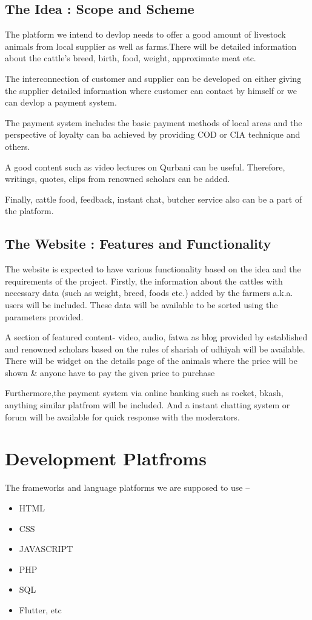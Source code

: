 \documentclass[a4paper,12pt]{report}
\begin{document}
\subsection*{The Idea : Scope and Scheme}
The platform we intend to devlop needs to offer a good amount of  livestock animals from local supplier as well as farms.There will be detailed information about the cattle's breed, birth, food, weight, approximate meat etc.

The interconnection of customer and supplier can be developed on either giving the supplier detailed information where customer can contact by himself or we can devlop a payment system.


The payment system includes the basic payment methods of local areas and the perspective of loyalty can ba achieved by providing COD or CIA technique and others.

A good content such as video lectures on Qurbani can be useful. Therefore, writings, quotes, clips from renowned scholars can be added.

Finally, cattle food, feedback, instant chat, butcher service also can be a part of the platform.

\subsection*{The Website : Features and Functionality}

The website is expected to have various functionality based on the idea and the requirements of the project. Firstly, the information about the cattles with necessary data (such as weight, breed, foods etc.) added by the farmers a.k.a. users will be included. These data will be available to be sorted using the parameters provided.

A section of featured content- video, audio, fatwa as blog provided by established and renowned scholars based on the rules of shariah of udhiyah will be available.
There will be widget on the details page of the animals where the price will be shown \& anyone have to pay the given price to purchase %

Furthermore,the payment system via online banking such as rocket, bkash, anything similar platfrom will be included. And a instant chatting system or forum will be available for quick response with the moderators.

\section*{Development Platfroms}
The frameworks and language platforms we are supposed to use --
\begin{itemize}
	\item HTML
	\item CSS
	\item JAVASCRIPT
	\item PHP
	\item SQL
\item Flutter, etc
\end{itemize}
\end{document}
